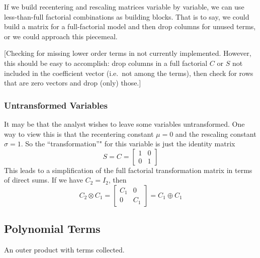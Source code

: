 \documentclass[]{article}
\begin{document}
If we build recentering and rescaling matrices variable by variable, we
can use less-than-full factorial combinations as building blocks. That
is to say, we could build a matrix for a full-factorial model and then
drop columns for unused terms, or we could approach this piecemeal.

{[}Checking for missing lower order terms in not currently implemented.
However, this should be easy to accomplish: drop columns in a full
factorial \(C\) or \(S\) not included in the coefficient vector
(i.e.~not among the terms), then check for rows that are zero vectors
and drop (only) those.{]}

\subsubsection{Untransformed Variables}\label{untransformed-variables}

It may be that the analyst wishes to leave some variables untransformed.
One way to view this is that the recentering constant \(\mu=0\) and the
rescaling constant \(\sigma=1\). So the ``transformation''" for this
variable is just the identity matrix
\[S=C=\begin{bmatrix}1 & 0 \\ 0 &1 \end{bmatrix}\] This leads to a
simplification of the full factorial transformation matrix in terms of
direct sums. If we have \(C_2=I_2\), then
\[C_2 \otimes C_1 = \begin{bmatrix}C_1 &0 \\ 0 &C_1\end{bmatrix} = C_1 \oplus C_1 \]

\subsection{Polynomial Terms}\label{polynomial-terms}

An outer product with terms collected.
\end{document}
